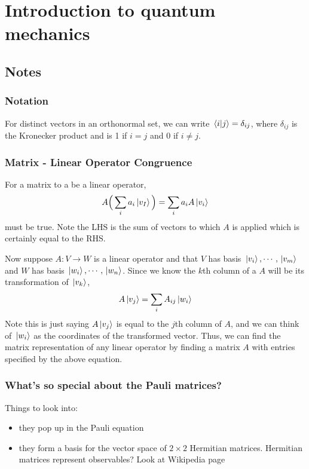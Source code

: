 \chapter{Introduction to quantum mechanics}

\section{Notes}

\subsection{Notation}

For distinct vectors in an orthonormal set, we can write $\braket*{i}{j} = \delta_{ij}$, where $\delta_{ij}$ is the Kronecker product and is 1 if $i = j$ and 0 if $i \neq j$. 

\subsection{Matrix - Linear Operator Congruence}

For a matrix to a be a linear operator, 
$$A \Big( \sum_{i} a_{i} \ket*{v_{I}} \Big) = \sum_{i} a_{i} A \ket*{v_{i}}$$
must be true. Note the LHS is the sum of vectors to which $A$ is applied which is certainly equal to the RHS. 

Now suppose $A: V \rightarrow W$ is a linear operator and that $V$ has basis $\ket*{v_{i}}, \cdots, \ket*{v_{m}}$ and $W$ has basis $\ket*{w_{i}}, \cdots, \ket*{w_{n}}$. Since we know the $k$th column of a $A$ will be its transformation of $\ket*{v_{k}}$, 
$$A \ket*{v_{j}} = \sum_{i} A_{ij} \ket*{w_{i}}$$
Note this is just saying $A \ket*{v_{j}}$ is equal to the $j$th column of $A$, and we can think of $\ket*{w_{i}}$ as the coordinates of the transformed vector. Thus, we can find the matrix representation of any linear operator by finding a matrix $A$ with entries specified by the above equation. 

\subsection{What's so special about the Pauli matrices?}

Things to look into: \begin{itemize}
\item they pop up in the Pauli equation 
\item they form a basis for the vector space of $2 \times 2$ Hermitian matrices. Hermitian matrices represent observables? Look at Wikipedia page
\end{itemize}

